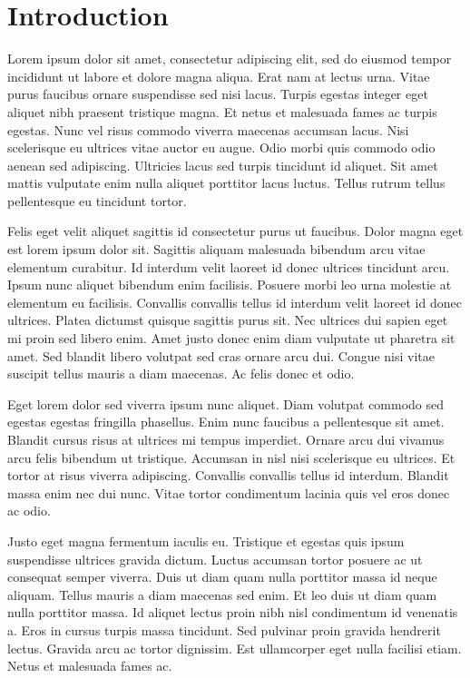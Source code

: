 %
%

\chapter{Introduction}
\label{cha:introduction}

Lorem ipsum dolor sit amet, consectetur adipiscing elit, sed do eiusmod tempor incididunt ut labore et dolore magna aliqua. Erat nam at lectus urna. Vitae purus faucibus ornare suspendisse sed nisi lacus. Turpis egestas integer eget aliquet nibh praesent tristique magna. Et netus et malesuada fames ac turpis egestas. Nunc vel risus commodo viverra maecenas accumsan lacus. Nisi scelerisque eu ultrices vitae auctor eu augue. Odio morbi quis commodo odio aenean sed adipiscing. Ultricies lacus sed turpis tincidunt id aliquet. Sit amet mattis vulputate enim nulla aliquet porttitor lacus luctus. Tellus rutrum tellus pellentesque eu tincidunt tortor.

Felis eget velit aliquet sagittis id consectetur purus ut faucibus. Dolor magna eget est lorem ipsum dolor sit. Sagittis aliquam malesuada bibendum arcu vitae elementum curabitur. Id interdum velit laoreet id donec ultrices tincidunt arcu. Ipsum nunc aliquet bibendum enim facilisis. Posuere morbi leo urna molestie at elementum eu facilisis. Convallis convallis tellus id interdum velit laoreet id donec ultrices. Platea dictumst quisque sagittis purus sit. Nec ultrices dui sapien eget mi proin sed libero enim. Amet justo donec enim diam vulputate ut pharetra sit amet. Sed blandit libero volutpat sed cras ornare arcu dui. Congue nisi vitae suscipit tellus mauris a diam maecenas. Ac felis donec et odio.

Eget lorem dolor sed viverra ipsum nunc aliquet. Diam volutpat commodo sed egestas egestas fringilla phasellus. Enim nunc faucibus a pellentesque sit amet. Blandit cursus risus at ultrices mi tempus imperdiet. Ornare arcu dui vivamus arcu felis bibendum ut tristique. Accumsan in nisl nisi scelerisque eu ultrices. Et tortor at risus viverra adipiscing. Convallis convallis tellus id interdum. Blandit massa enim nec dui nunc. Vitae tortor condimentum lacinia quis vel eros donec ac odio.

Justo eget magna fermentum iaculis eu. Tristique et egestas quis ipsum suspendisse ultrices gravida dictum. Luctus accumsan tortor posuere ac ut consequat semper viverra. Duis ut diam quam nulla porttitor massa id neque aliquam. Tellus mauris a diam maecenas sed enim. Et leo duis ut diam quam nulla porttitor massa. Id aliquet lectus proin nibh nisl condimentum id venenatis a. Eros in cursus turpis massa tincidunt. Sed pulvinar proin gravida hendrerit lectus. Gravida arcu ac tortor dignissim. Est ullamcorper eget nulla facilisi etiam. Netus et malesuada fames ac.


